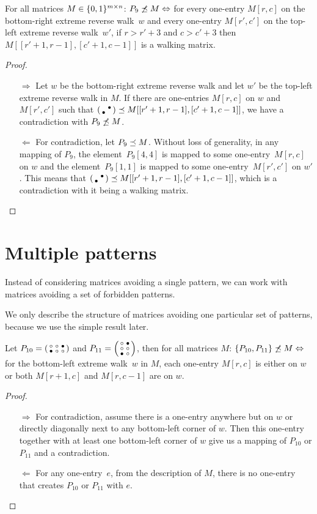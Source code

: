\begin{prop}
For all matrices $M\in\{0,1\}^{m\times n}$: $P_9\not\preceq M\Leftrightarrow$ for every one-entry $M[r,c]$ on the bottom-right extreme reverse walk~$w$ and every one-entry $M[r',c']$ on the top-left extreme reverse walk~$w'$, if $r>r'+3$ and $c>c'+3$ then $M[[r'+1,r-1],[c'+1,c-1]]$ is a walking matrix.
\end{prop}
\begin{proof}
\begin{itemize}
	\item[$\Rightarrow$] Let $w$ be the bottom-right extreme reverse walk and let $w'$ be the top-left extreme reverse walk in $M$. If there are one-entries $M[r,c]$ on $w$ and $M[r',c']$ such that $\left(\begin{smallmatrix} &\bullet\\\bullet& \end{smallmatrix}\right)\preceq M[[r'+1,r-1],[c'+1,c-1]]$, we have a contradiction with $P_9\not\preceq M$.
	\item[$\Leftarrow$] For contradiction, let $P_9\preceq M$. Without loss of generality, in any mapping of $P_9$, the element~$P_9[4,4]$ is mapped to some one-entry~$M[r,c]$ on $w$ and the element~$P_9[1,1]$ is mapped to some one-entry~$M[r',c']$ on $w'$. This means that $\left(\begin{smallmatrix} &\bullet\\\bullet& \end{smallmatrix}\right)\preceq M[[r'+1,r-1],[c'+1,c-1]]$, which is a contradiction with it being a walking matrix. \qedhere
\end{itemize}
\end{proof}

\section{Multiple patterns}
Instead of considering matrices avoiding a single pattern, we can work with matrices avoiding a set of forbidden patterns.

We only describe the structure of matrices avoiding one particular set of patterns, because we use the simple result later.

\begin{prop}
\label{prop:twopatterns}
Let $P_{10}=\left(\begin{smallmatrix}\circ&\circ&\bullet\\\bullet&\circ&\circ\end{smallmatrix}\right)$ and $P_{11}=\left(\begin{smallmatrix}\circ&\bullet\\\circ&\circ\\\bullet&\circ\end{smallmatrix}\right)$, then for all matrices $M$: $\{P_{10},P_{11}\}\not\preceq M\Leftrightarrow$ for the bottom-left extreme walk~$w$ in $M$, each one-entry $M[r,c]$ is either on $w$ or both $M[r+1,c]$ and $M[r,c-1]$ are on $w$.
\end{prop}
\begin{proof}
\begin{itemize}
	\item[$\Rightarrow$] For contradiction, assume there is a one-entry anywhere but on $w$ or directly diagonally next to any bottom-left corner of $w$. Then this one-entry together with at least one bottom-left corner of $w$ give us a mapping of $P_{10}$ or $P_{11}$ and a contradiction.
	\item[$\Leftarrow$] For any one-entry~$e$, from the description of $M$, there is no one-entry that creates $P_{10}$ or $P_{11}$ with $e$. \qedhere
\end{itemize}
\end{proof}